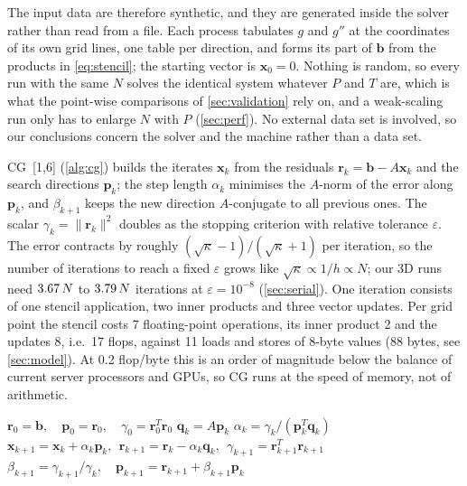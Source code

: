 \documentclass[10pt,a4paper]{article}
\newcommand{\vb}[1]{\mathbf{#1}}
\begin{document}
The input data are therefore synthetic, and they are generated inside the solver rather than read from a
file. Each process tabulates $g$ and $g''$ at the coordinates of its own grid lines, one table per
direction, and forms its part of $\vb b$ from the products in \eqref{eq:stencil}; the starting vector is
$\vb x_0=0$. Nothing is random, so every run with the same $N$ solves the identical system whatever $P$ and
$T$ are, which is what the point-wise comparisons of \cref{sec:validation} rely on, and a weak-scaling run
only has to enlarge $N$ with $P$ (\cref{sec:perf}). No external data set is involved, so our conclusions
concern the solver and the machine rather than a data set.

CG~[1,6] (\cref{alg:cg}) builds the iterates $\vb x_k$ from the residuals $\vb r_k=\vb b-A\vb x_k$ and the
search directions $\vb p_k$; the step length $\alpha_k$ minimises the $A$-norm of the error along
$\vb p_k$, and $\beta_{k+1}$ keeps the new direction $A$-conjugate to all previous ones. The scalar
$\gamma_k=\|\vb r_k\|^2$ doubles as the stopping criterion with relative tolerance $\varepsilon$. The
error contracts by roughly $(\sqrt{\kappa}-1)/(\sqrt{\kappa}+1)$ per iteration, so the number of
iterations to reach a fixed $\varepsilon$ grows like $\sqrt{\kappa}\propto 1/h\propto N$; our 3D runs need
$3.67\,N$ to $3.79\,N$ iterations at $\varepsilon=10^{-8}$ (\cref{sec:serial}). One iteration consists of one
stencil application, two inner products and three vector updates. Per grid point the stencil costs 7
floating-point operations, its inner product 2 and the updates 8, i.e.\ 17 flops, against 11 loads and
stores of 8-byte values (88 bytes, see \cref{sec:model}). At 0.2 flop/byte this is an order of magnitude
below the balance of current server processors and GPUs, so CG runs at the speed of memory, not of
arithmetic.

\begin{algorithm}[htb]
\caption{Conjugate Gradients for $A\vb x=\vb b$ with $\vb x_0=0$. Framed comments mark the points where a
parallel implementation must communicate.}\label{alg:cg}
\begin{algorithmic}[1]
\State $\vb r_0=\vb b,\quad \vb p_0=\vb r_0,\quad \gamma_0=\vb r_0^T\vb r_0$
\For{$k=0,1,2,\dots$ \textbf{until} $\sqrt{\gamma_k}\le \varepsilon\,\|\vb b\|$}
  \State $\vb q_k = A\vb p_k$ \Comment{\fbox{halo exchange} of $\vb p_k$, then stencil}
  \State $\alpha_k = \gamma_k/(\vb p_k^T\vb q_k)$ 
  \State $\vb x_{k+1}=\vb x_k+\alpha_k\vb p_k,\ \ \vb r_{k+1}=\vb r_k-\alpha_k\vb q_k,\ \ \gamma_{k+1}=\vb r_{k+1}^T\vb r_{k+1}$ 
  \State $\beta_{k+1}=\gamma_{k+1}/\gamma_k,\quad \vb p_{k+1}=\vb r_{k+1}+\beta_{k+1}\vb p_k$
\EndFor
\end{algorithmic}
\end{algorithm}
\end{document}
